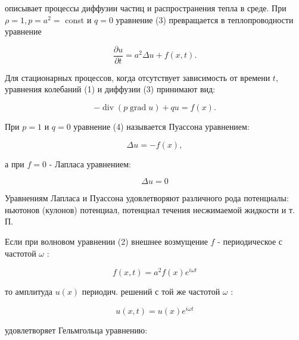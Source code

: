 \documentclass[10pt]{article}
\begin{document}
описывает процессы диффузии частиц и распространения тепла в среде. При $\rho=1, p=a^{2}=$ const и $q=0$ уравнение (3) превращается в теплопроводности уравнение



\[

\frac{\partial u}{\partial t}=a^{2} \Delta u+f(x, t) .

\]



Для стационарных процессов, когда отсутствует зависимость от времени $t$, уравнения колебаний (1) и диффузии (3) принимают вид:



\[

-\operatorname{div}(p \operatorname{grad} u)+q u=f(x) .

\]



При $p=1$ и $q=0$ уравнение (4) называется Пуассона уравнением:



\[

\Delta u=-f(x),

\]



а при $f=0$ - Лапласа уравнением:



\[

\Delta u=0

\]



Уравнениям Лапласа и Пуассона удовлетворяют различного рода потенциалы: ньютонов (кулонов) потенциал, потенциал течения несжимаемой жидкости и т. П.



Если при волновом уравнении (2) внешнее возмущение $f$ - периодическое с частотой $\omega$ :



\[

f(x, t)=a^{2} f(x) e^{i \omega t}

\]



то амплитуда $u(x)$ периодич. решений с той же частотой $\omega$ :



\[

u(x, t)=u(x) e^{i \omega t}

\]



удовлетворяет Гельмгольца уравнению:
\end{document}
